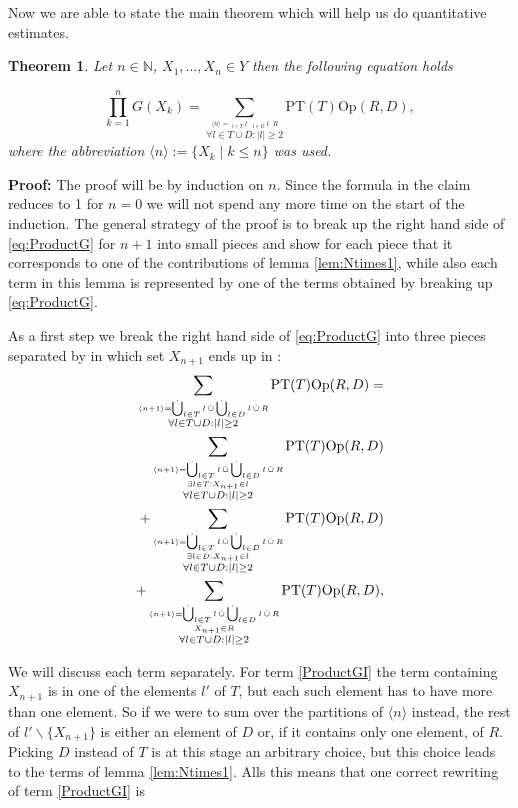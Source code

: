 \documentclass[b5paper,draft,openbib,12pt]{memoir}
\newtheorem{Thm}[Def]{Theorem}
\DeclareMathOperator{\dotCup}{\mathop{\dot{\bigcup}}}
\DeclareMathOperator{\dotcup}{\mathop{\dot{\cup}}}
\begin{document}
Now we are able to state the main theorem which will help us do quantitative estimates.

\begin{Thm}
Let \(n\in\mathbb{N}\), \(X_1,\dots, X_n \in Y\) then the following equation holds

\begin{equation}\label{eq:ProductG}
\prod_{k=1}^n G(X_k)= 
\sum_{\stackrel{\langle n \rangle = \dotCup_{l\in T} l \dotcup \dotCup_{l\in D} l \dotcup R}{ \forall l \in T \cup D: |l|\ge 2}} \text{PT}(T) \text{Op}(R,D),
\end{equation}
where the abbreviation \(\langle n\rangle:= \{X_k\mid k\le n\}\) was used.
\end{Thm}
{\bfseries Proof:} The proof will be by induction on \(n\). Since the formula in the claim reduces to 1 for \(n=0\) we will
not spend any more time on the start of the induction. The general strategy of the proof is to break up the right 
hand side of \eqref{eq:ProductG} for \(n+1\) into small pieces and show for each piece that it corresponds to one of
the contributions of lemma \ref{lem:Ntimes1}, while also each term in this lemma is represented by one of the terms
obtained by breaking up \eqref{eq:ProductG}.

As a first step we break the right hand side of \eqref{eq:ProductG} into three pieces separated by in which set \(X_{n+1}\) 
ends up in :
\begin{align}\notag
\sum_{\stackrel{\langle n +1 \rangle = \dotCup_{l\in T} l \dotcup \dotCup_{l\in D} l \dotcup R}{ \forall l \in T \cup D: |l|\ge 2}} \text{PT}(T) \text{Op}(R,D)=\\\label{ProductGI}
\sum_{\stackrel{\langle n +1 \rangle = \dotCup_{l\in T} l \dotcup \dotCup_{l\in D} l \dotcup R}{\stackrel{\exists l \in T: X_{n+1}\in l}{ \forall l \in T \cup D: |l|\ge 2}}} \text{PT}(T) \text{Op}(R,D)\\\label{ProductGII}
+\sum_{\stackrel{\langle n +1 \rangle = \dotCup_{l\in T} l \dotcup \dotCup_{l\in D} l \dotcup R}{\stackrel{\exists l\in D: X_{n+1}\in l}{ \forall l \in T \cup D: |l|\ge 2}}} \text{PT}(T) \text{Op}(R,D)\\\label{ProductGIII}
+\sum_{\stackrel{\langle n +1 \rangle = \dotCup_{l\in T} l \dotcup \dotCup_{l\in D} l \dotcup R}{\stackrel{X_{n+1}\in R}{ \forall l \in T \cup D: |l|\ge 2}}} \text{PT}(T) \text{Op}(R,D),
\end{align}

We will discuss each term separately. For term \eqref{ProductGI} the term containing \(X_{n+1}\) is in one of the elements \(l'\) of \(T\), 
but each such element has to have more than one element. So if we were to sum over the partitions of \(\langle n\rangle \) instead,
the rest of \(l'\backslash \{X_{n+1}\}\) is either an element of \(D\) or, if it contains only one element, of \(R\). Picking \(D\) instead of \(T\)
is at this stage an arbitrary choice, but this choice leads to the terms of lemma \ref{lem:Ntimes1}. Alls this means that one
correct rewriting of term \eqref{ProductGI} is
\end{document}
